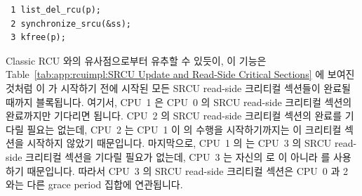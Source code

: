 \vspace{5pt}
\begin{minipage}[t]{\columnwidth}
\scriptsize
\begin{verbatim}
 1 list_del_rcu(p);
 2 synchronize_srcu(&ss);
 3 kfree(p);
\end{verbatim}
\end{minipage}
\vspace{5pt}

Classic RCU 와의 유사점으로부터 유추할 수 있듯이, 이 기능은
Table~\ref{tab:app:rcuimpl:SRCU Update and Read-Side Critical Sections} 에
보여진 것처럼 이  가 시작하기 전에 시작된 모든 SRCU
read-side 크리티컬 섹션들이 완료될 때까지 블록됩니다.
여기서, CPU~1 은 CPU~0 의 SRCU read-side 크리티컬 섹션의 완료까지만 기다리면
됩니다.
CPU~2 의 SRCU read-side 크리티컬 섹션의 완료를 기다릴 필요는 없는데, CPU~2 는
CPU~1 이  의 수행을 시작하기까지는 이 크리티컬 섹션을
시작하지 않았기 때문입니다.
마지막으로, CPU~1 의  는 CPU~3 의 SRCU read-side
크리티컬 섹션을 기다릴 필요가 없는데, CPU~3 는 자신의 
 로  이 아니라  를 사용하기 때문입니다.
따라서 CPU~3 의 SRCU read-side 크리티컬 섹션은 CPU~0 과 2 와는 다른 grace
period 집합에 연관됩니다.


